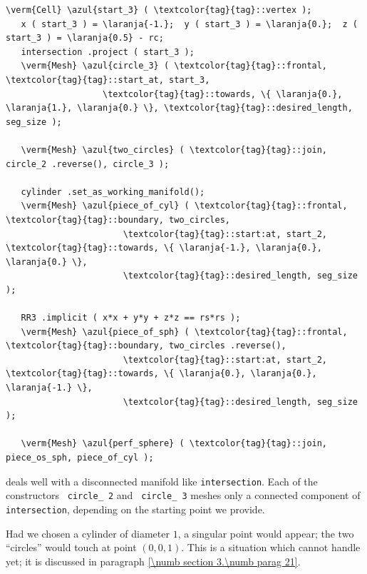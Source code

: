 \begin{Verbatim}[commandchars=\\\{\},formatcom=\small\tt,frame=single,
   label=parag-\ref{\numb section 3.\numb parag 19}.cpp,rulecolor=\color{moldura},
   baselinestretch=0.94,framesep=2mm                                              ]
   \verm{Cell} \azul{start_3} ( \textcolor{tag}{tag}::vertex );
   x ( start_3 ) = \laranja{-1.};  y ( start_3 ) = \laranja{0.};  z ( start_3 ) = \laranja{0.5} - rc;
   intersection .project ( start_3 );
   \verm{Mesh} \azul{circle_3} ( \textcolor{tag}{tag}::frontal, \textcolor{tag}{tag}::start_at, start_3,
                   \textcolor{tag}{tag}::towards, \{ \laranja{0.}, \laranja{1.}, \laranja{0.} \}, \textcolor{tag}{tag}::desired_length, seg_size );

   \verm{Mesh} \azul{two_circles} ( \textcolor{tag}{tag}::join, circle_2 .reverse(), circle_3 );

   cylinder .set_as_working_manifold();
   \verm{Mesh} \azul{piece_of_cyl} ( \textcolor{tag}{tag}::frontal, \textcolor{tag}{tag}::boundary, two_circles,
                       \textcolor{tag}{tag}::start:at, start_2, \textcolor{tag}{tag}::towards, \{ \laranja{-1.}, \laranja{0.}, \laranja{0.} \},
                       \textcolor{tag}{tag}::desired_length, seg_size                         );

   RR3 .implicit ( x*x + y*y + z*z == rs*rs );
   \verm{Mesh} \azul{piece_of_sph} ( \textcolor{tag}{tag}::frontal, \textcolor{tag}{tag}::boundary, two_circles .reverse(),
                       \textcolor{tag}{tag}::start:at, start_2, \textcolor{tag}{tag}::towards, \{ \laranja{0.}, \laranja{0.}, \laranja{-1.} \},
                       \textcolor{tag}{tag}::desired_length, seg_size                         );

   \verm{Mesh} \azul{perf_sphere} ( \textcolor{tag}{tag}::join, piece_os_sph, piece_of_cyl );
\end{Verbatim}

{\ManiFEM} deals well with a disconnected manifold like {\small\tt intersection}.
Each of the constructors {\small\tt{} circle\_\,2} and {\small\tt{} circle\_\,3}
meshes only a connected component of {\small\tt intersection}, depending on the starting point
we provide.

Had we chosen a cylinder of diameter $1$, a singular point would appear;
the two ``circles'' would touch at point $ (0,0,1) $.
This is a situation which {\maniFEM} cannot handle yet; it is discussed in paragraph
\ref{\numb section 3.\numb parag 21}.


